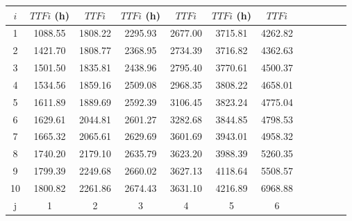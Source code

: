 \documentclass{article}
\begin{document}
\begin{table}[H]
    \centering
    \begin{tabular}{|*{12}{c|}}
        \hline
        $i$ & $TTFi$ (h) & $TTFi$ & $TTFi$ (h) & $TTFi$ & $TTFi$ (h) & $TTFi$ \\
        \hline
        1 & 1088.55 & 1808.22 & 2295.93 & 2677.00 & 3715.81 & 4262.82 \\
        2 & 1421.70 & 1808.77 & 2368.95 & 2734.39 & 3716.82 & 4362.63 \\
        3 & 1501.50 & 1835.81 & 2438.96 & 2795.40 & 3770.61 & 4500.37 \\
        4 & 1534.56 & 1859.16 & 2509.08 & 2968.35 & 3808.22 & 4658.01 \\
        5 & 1611.89 & 1889.69 & 2592.39 & 3106.45 & 3823.24 & 4775.04 \\
        6 & 1629.61 & 2044.81 & 2601.27 & 3282.68 & 3844.85 & 4798.53 \\
        7 & 1665.32 & 2065.61 & 2629.69 & 3601.69 & 3943.01 & 4958.32 \\
        8 & 1740.20 & 2179.10 & 2635.79 & 3623.20 & 3988.39 & 5260.35 \\
        9 & 1799.39 & 2249.68 & 2660.02 & 3627.13 & 4118.64 & 5508.57 \\
        10 & 1800.82 & 2261.86 & 2674.43 & 3631.10 & 4216.89 & 6968.88 \\
        j & 1 & 2 & 3 & 4 & 5 & 6 \\
        \hline
    \end{tabular}
    \label{table:4}
\end{table}
\end{document}
